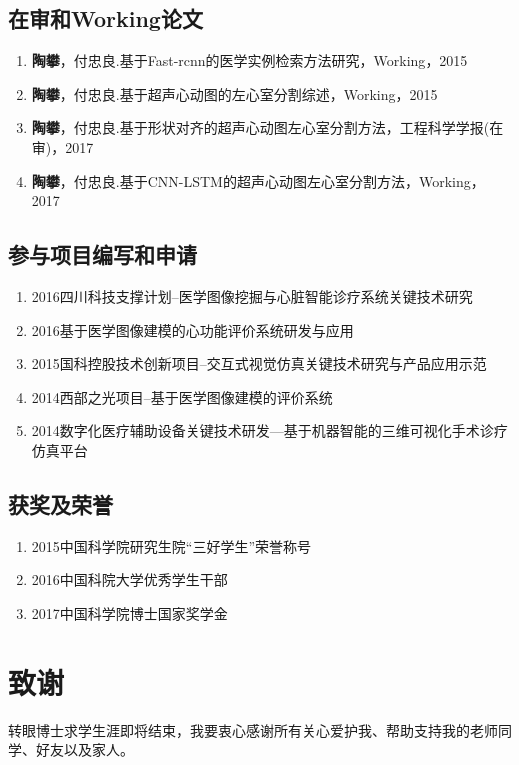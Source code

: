 \section*{在审和Working论文}
\begin{enumerate}
\item{\textbf{陶攀}，付忠良.{基于Fast-rcnn的医学实例检索方法研究}，{Working}，2015}
\item{\textbf{陶攀}，付忠良.{基于超声心动图的左心室分割综述}，{Working}，2015}
\item{\textbf{陶攀}，付忠良.{基于形状对齐的超声心动图左心室分割方法}，{工程科学学报(在审)}，2017}
\item{\textbf{陶攀}，付忠良.{基于CNN-LSTM的超声心动图左心室分割方法}，{Working}，2017}

\end{enumerate}


\section*{参与项目编写和申请}
\begin{enumerate}
\item{2016}{四川科技支撑计划--医学图像挖掘与心脏智能诊疗系统关键技术研究 }{}
\item{2016}{基于医学图像建模的心功能评价系统研发与应用}{}
\item{2015}{国科控股技术创新项目--交互式视觉仿真关键技术研究与产品应用示范}{}
\item{ 2014}{西部之光项目--基于医学图像建模的评价系统 }{}
\item{2014}{数字化医疗辅助设备关键技术研发—基于机器智能的三维可视化手术诊疗仿真平台}{}
\end{enumerate}
\section*{获奖及荣誉}
\begin{enumerate}
\item{2015}{中国科学院研究生院“三好学生”荣誉称号}
\item{2016}{中国科院大学优秀学生干部}
\item{2017}{中国科学院博士国家奖学金}
\end{enumerate}

\chapter{致\quad 谢}

转眼博士求学生涯即将结束，我要衷心感谢所有关心爱护我、帮助支持我的老师同学、好友以及家人。

